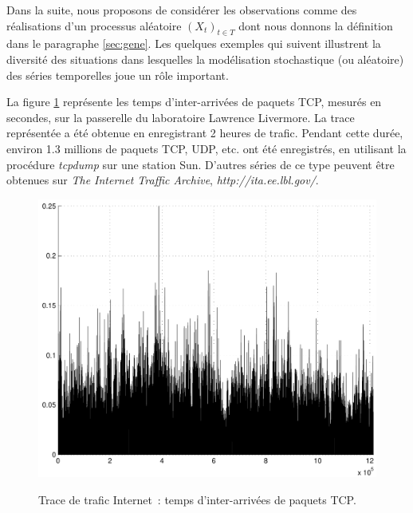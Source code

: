 Dans la suite, nous proposons de consid\'erer les observations comme
des r\'ealisations d'un processus al\'eatoire $(X_t)_{t\in T}$ dont nous
donnons la d\'efinition dans le paragraphe \ref{sec:gene}. Les quelques
exemples qui suivent illustrent la diversit\'e des situations dans
lesquelles la mod\'elisation stochastique (ou al\'eatoire) des s\'eries
temporelles joue un r\^ole important.
\begin{example}
La figure \ref{fig:figtraf} repr\'esente les temps d'inter-arriv\'ees
de paquets TCP, mesur\'es en secondes, sur la passerelle du
laboratoire Lawrence Livermore. La trace repr\'esent\'ee a \'et\'e obtenue
en enregistrant 2 heures de trafic. Pendant cette dur\'ee, environ
1.3 millions de paquets TCP, UDP, etc. ont \'et\'e enregistr\'es, en
utilisant la proc\'edure \emph{tcpdump} sur une station Sun.
D'autres s\'eries de ce type peuvent \^{e}tre obtenues sur
\emph{The Internet Traffic Archive},
\emph{http://ita.ee.lbl.gov/}.
\begin{figure}
  \centering
  \includegraphics[width=\textwidth]{Figures/lbl_tcp_3}\\
  \caption{Trace de trafic Internet~: temps d'inter-arriv\'ees de paquets TCP.}\label{fig:figtraf}
\end{figure}
\end{example}
